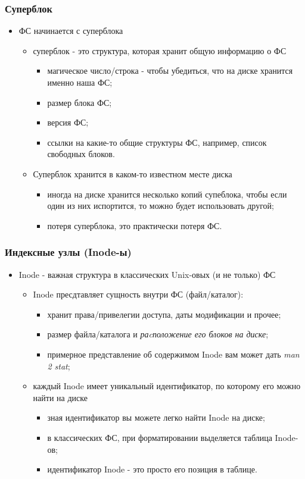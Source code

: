 \begin{frame}
\frametitle{Суперблок}
\begin{itemize}
  \item ФС начинается с суперблока
  \begin{itemize}
    \item суперблок - это структура, которая хранит общую информацию о ФС
    \begin{itemize}
      \item магическое число/строка - чтобы убедиться, что на диске хранится
      именно наша ФС;
      \item размер блока ФС;
      \item версия ФС;
      \item ссылки на какие-то общие структуры ФС, например, список свободных
      блоков.
    \end{itemize}
    \item Суперблок хранится в каком-то известном месте диска
    \begin{itemize}
      \item иногда на диске хранится несколько копий супеблока, чтобы если один
      из них испортится, то можно будет использовать другой;
      \item потеря суперблока, это практически потеря ФС.
    \end{itemize}
  \end{itemize}
\end{itemize}
\end{frame}

\begin{frame}
\frametitle{Индексные узлы (Inode-ы)}
\begin{itemize}
  \item Inode - важная структура в классических Unix-овых (и не только) ФС
  \begin{itemize}
    \item Inode пресдтавляет сущность внутри ФС (файл/каталог):
    \begin{itemize}
      \item хранит права/привелегии доступа, даты модификации и прочее;
      \item размер файла/каталога и \emph{раcположение его блоков на диске};
      \item примерное представление об содержимом Inode вам может дать
      \emph{man 2 stat};
    \end{itemize}
    \item каждый Inode имеет уникальный идентификатор, по которому его можно
    найти на диске
    \begin{itemize}
      \item зная идентификатор вы можете легко найти Inode на диске;
      \item в классических ФС, при форматировании выделяется таблица Inode-ов;
      \item идентификатор Inode - это просто его позиция в таблице.
    \end{itemize}
  \end{itemize}
\end{itemize}
\end{frame}

